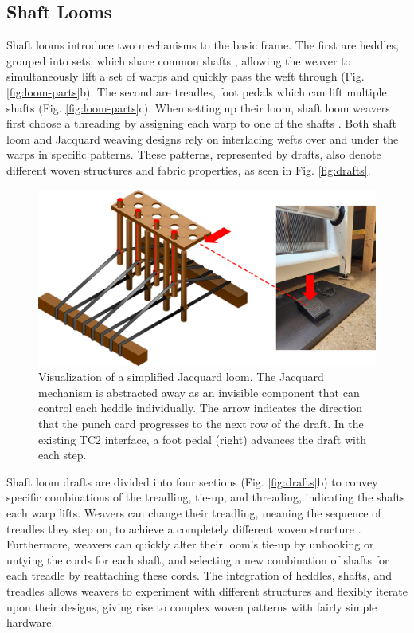 \subsection{Shaft Looms}

Shaft looms introduce two mechanisms to the basic frame. The first are heddles, grouped into sets, which share common shafts \cite{broudy_book_1993}, allowing the weaver to simultaneously lift a set of warps and quickly pass the weft through (Fig. \ref{fig:loom-parts}b). The second are treadles, foot pedals which can lift multiple shafts (Fig. \ref{fig:loom-parts}c). When setting up their loom, shaft loom weavers first choose a threading by assigning each warp to one of the shafts \cite{chandler_learning_2009, osterkamp_weaving_2005}. Both shaft loom and Jacquard weaving designs rely on interlacing wefts over and under the warps in specific patterns. These patterns, represented by drafts, also denote different woven structures and fabric properties, as seen in Fig. \ref{fig:drafts}. 

\begin{figure}
    \centering
    \includegraphics[width=0.6\linewidth]{figs/LP_4_jacquard-loom.png}
    \caption[Visualization of a simplified Jacquard loom.]{Visualization of a simplified Jacquard loom. The Jacquard mechanism is abstracted away as an invisible component that can control each heddle individually. The arrow indicates the direction that the punch card progresses to the next row of the draft. In the existing TC2 interface, a foot pedal (right) advances the draft with each step.}
    \label{fig:jacquard-mech}
\end{figure}

Shaft loom drafts are divided into four sections (Fig. \ref{fig:drafts}b) to convey specific combinations of the treadling, tie-up, and threading, indicating the shafts each warp lifts. Weavers can change their treadling, meaning the sequence of treadles they step on, to achieve a completely different woven structure \cite{kesler-simpson_creative_2021}. Furthermore, weavers can quickly alter their loom’s tie-up by unhooking or untying the cords for each shaft, and selecting a new combination of shafts for each treadle by reattaching these cords. The integration of heddles, shafts, and treadles allows weavers to experiment with different structures and flexibly iterate upon their designs, giving rise to complex woven patterns with fairly simple hardware. 

